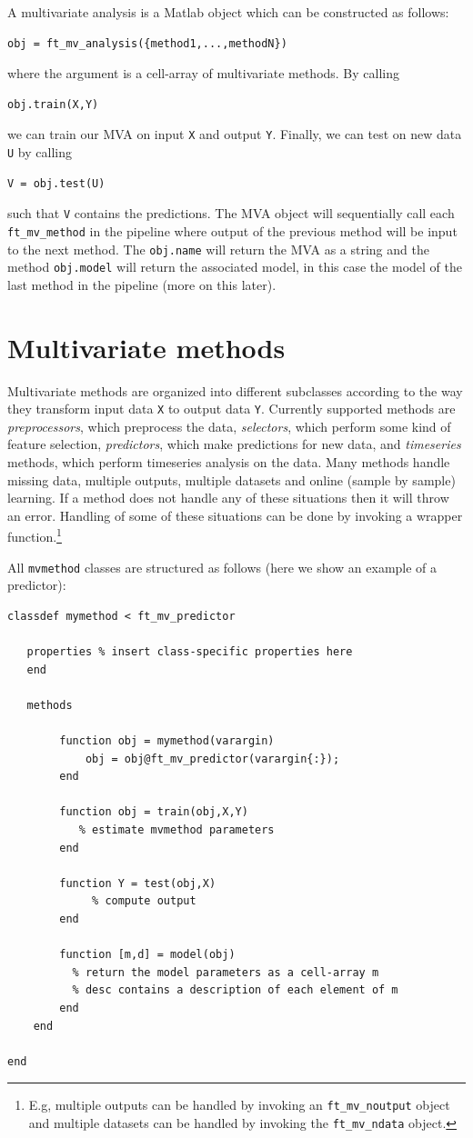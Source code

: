 \documentclass{article}
\renewcommand{\t}[1]{{\tt #1}}
\begin{document}
A multivariate analysis is a Matlab object which can be constructed as follows:
\begin{verbatim}
obj = ft_mv_analysis({method1,...,methodN})
\end{verbatim}
where the argument is a cell-array of multivariate methods. By calling
\begin{verbatim}
obj.train(X,Y)
\end{verbatim}
we can train our MVA on input \t{X} and output \t{Y}. Finally, we can test on new data \t{U} by calling
\begin{verbatim}
V = obj.test(U)
\end{verbatim}
such that \t{V} contains the predictions. The MVA object will sequentially call each \t{ft\_mv\_method} in the pipeline where output of the previous method will be input to the next method. The \t{obj.name} will return the MVA as a string and the method \t{obj.model} will return the associated model, in this case the model of the last method in the pipeline (more on this later).


\section{Multivariate methods}

Multivariate methods are organized into different subclasses according to the way they transform input data \t{X} to output data \t{Y}. Currently supported methods are {\em preprocessors}, which preprocess the data, {\em selectors}, which perform some kind of feature selection, {\em predictors}, which make predictions for new data, and {\em timeseries} methods, which perform timeseries analysis on the data. Many methods handle missing data, multiple outputs, multiple datasets and online (sample by sample) learning. If a method does not handle any of these situations then it will throw an error. Handling of some of these situations can be done by invoking a wrapper function.\footnote{E.g, multiple outputs can be handled by invoking an \t{ft\_mv\_noutput} object and multiple datasets can be handled by invoking the \t{ft\_mv\_ndata} object.}

All \t{mvmethod} classes are structured as follows (here we show an example of a predictor):
\begin{verbatim}
classdef mymethod < ft_mv_predictor
 
   properties % insert class-specific properties here
   end
 
   methods
 
        function obj = mymethod(varargin)       
         	obj = obj@ft_mv_predictor(varargin{:});
        end        
 
        function obj = train(obj,X,Y)
           % estimate mvmethod parameters
        end
 
        function Y = test(obj,X)
        	 % compute output     
        end
 
        function [m,d] = model(obj)
          % return the model parameters as a cell-array m
          % desc contains a description of each element of m 
        end
    end
 
end
\end{verbatim}
\end{document}
